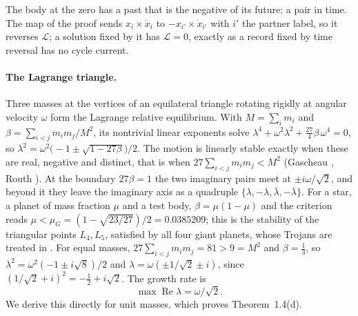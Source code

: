 \documentclass[11pt]{article}
\theoremstyle{definition}\newtheorem{definition}[theorem]{Definition}
\theoremstyle{remark}\newtheorem{remark}[theorem]{Remark}
\renewcommand{\Re}{\operatorname{Re}}\renewcommand{\Im}{\operatorname{Im}}
\begin{document}
The body at the zero has a past that is the negative of its future: a pair in time. The map of the proof sends $x_i\times\dot x_i$ to $-x_{i'}\times\dot x_{i'}$ with $i'$ the partner label, so it reverses $\mathcal L$; a solution fixed by it has $\mathcal L=0$, exactly as a record fixed by time reversal has no cycle current.

\paragraph{The Lagrange triangle.} Three masses at the vertices of an equilateral triangle rotating rigidly at angular velocity $\omega$ form the Lagrange relative equilibrium. With $M=\sum_im_i$ and $\beta=\sum_{i<j}m_im_j/M^2$, its nontrivial linear exponents solve $\lambda^4+\omega^2\lambda^2+\tfrac{27}{4}\beta\,\omega^4=0$, so $\lambda^2=\omega^2\bigl(-1\pm\sqrt{1-27\beta}\bigr)/2$. The motion is linearly stable exactly when these are real, negative and distinct, that is when $27\sum_{i<j}m_im_j<M^2$ (Gascheau \cite{Gascheau}, Routh \cite{Routh}). At the boundary $27\beta=1$ the two imaginary pairs meet at $\pm i\omega/\sqrt2$, and beyond it they leave the imaginary axis as a quadruple $\{\lambda,-\lambda,\bar\lambda,-\bar\lambda\}$. For a star, a planet of mass fraction $\mu$ and a test body, $\beta=\mu(1-\mu)$ and the criterion reads $\mu<\mu_G=(1-\sqrt{23/27})/2=0.0385209$; this is the stability of the triangular points $L_4,L_5$, satisfied by all four giant planets, whose Trojans are treated in \cite{SPlanet}. For equal masses, $27\sum_{i<j}m_im_j=81>9=M^2$ and $\beta=\tfrac13$, so $\lambda^2=\omega^2(-1\pm i\sqrt8)/2$ and
$\lambda=\omega(\pm1/\sqrt2\pm i)$, since $(1/\sqrt2+i)^2=-\tfrac12+i\sqrt2$. The growth rate is
\begin{equation}\label{eq:routh}
\max\Re\lambda=\omega/\sqrt2 .
\end{equation}
We derive this directly for unit masses, which proves Theorem~1.4(d).
\end{document}
